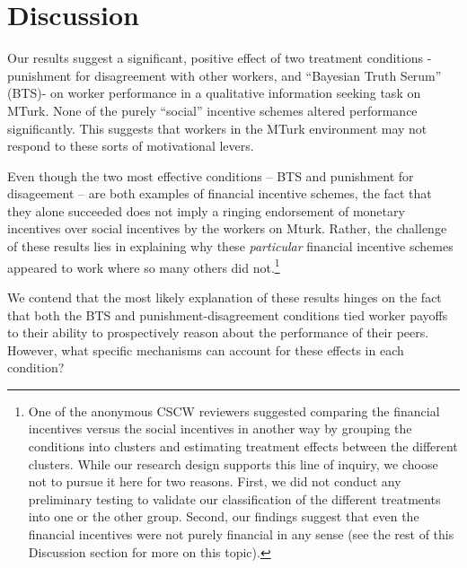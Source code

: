 \documentclass{chi2009}
\begin{document}
\section{Discussion}

Our results suggest a significant, positive effect of two treatment
conditions - punishment for disagreement with other workers, and
``Bayesian Truth Serum'' (BTS)- on worker performance in a qualitative
information seeking task on MTurk. None of the purely ``social'' incentive
schemes altered performance significantly. This suggests that workers
in the MTurk environment may not respond to these sorts of
motivational levers.

Even though the two most effective conditions -- BTS
and punishment for disageement -- are both examples of financial incentive
schemes, the fact that they alone succeeded does not imply a ringing
endorsement of monetary incentives over social incentives by the
workers on Mturk. Rather, the challenge of these results lies in
explaining why these \emph{particular} financial incentive schemes
appeared to work where so many others did not.\footnote{One of the
  anonymous CSCW reviewers suggested comparing the financial
  incentives versus the social incentives in another way by grouping
  the conditions into clusters and estimating treatment effects
  between the different clusters. While our research design supports
  this line of inquiry, we choose not to pursue it here for two
  reasons. First, we did not conduct any preliminary testing to
  validate our classification of the different treatments into one or
  the other group. Second, our findings suggest that even the
  financial incentives were not purely financial in any sense (see the
  rest of this Discussion section for more on this topic).}

We contend that the most likely explanation of these results hinges on
the fact that both the BTS and punishment-disagreement conditions tied
worker payoffs to their ability to prospectively reason about the
performance of their peers. However, what specific mechanisms can
account for these effects in each condition?
\end{document}
